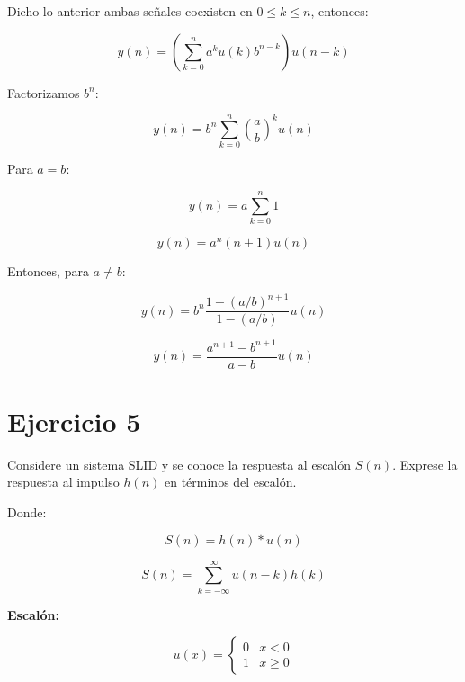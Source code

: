\documentclass[12pt,a4paper]{article}
\begin{document}
Dicho lo anterior ambas señales coexisten en $0 \leq k \leq n$, entonces:

\begin{equation}
y(n) = \left(\sum_{k=0}^{n} a^k u(k) b^{n-k}\right) u(n-k)
\end{equation}

Factorizamos $b^n$:

\begin{equation}
y(n) = b^n \sum_{k=0}^{n} \left(\frac{a}{b}\right)^k u(n)
\end{equation}
\vspace{0.4cm}

Para $a = b$:

\begin{equation}
y(n) = a \sum_{k=0}^{n} 1
\end{equation}
\vspace{0.4cm}

\begin{equation}
\boxed{y(n) = a^n(n+1) u(n)}
\end{equation}



Entonces, para $a \neq b$:

\begin{equation}
y(n) = b^n \frac{1-(a/b)^{n+1}}{1-(a/b)} u(n)
\end{equation}

\begin{equation}
\boxed{y(n) = \frac{a^{n+1} - b^{n+1}}{a - b} u(n)}
\end{equation}

\section*{Ejercicio 5}

Considere un sistema SLID y se conoce la respuesta al escalón $S(n)$. Exprese la respuesta al impulso $h(n)$ en términos del escalón.

Donde:

\begin{equation}
S(n) = h(n) * u(n)
\end{equation}

\begin{equation}
S(n) = \sum_{k=-\infty}^{\infty} u(n-k)h(k)
\end{equation}

\textbf{Escalón:}

\begin{equation}
u(x) = \begin{cases}
0 & x < 0 \\
1 & x \geq 0
\end{cases}
\end{equation}
\end{document}
